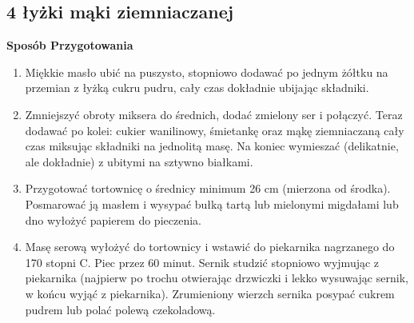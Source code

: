\documentclass[12pt, letterpaper, titlepage]{article}
\begin{document}
\subsection{4 łyżki mąki ziemniaczanej}

\textbf{Sposób Przygotowania }

\begin{enumerate}
\item Miękkie masło ubić na puszysto, stopniowo dodawać po jednym żółtku na przemian z łyżką cukru pudru, cały czas dokładnie ubijając składniki.
\item Zmniejszyć obroty miksera do średnich, dodać zmielony ser i połączyć. Teraz dodawać po kolei: cukier wanilinowy, śmietankę oraz mąkę ziemniaczaną cały czas miksując składniki na jednolitą masę. Na koniec wymieszać (delikatnie, ale dokładnie) z ubitymi na sztywno białkami.
\item Przygotować tortownicę o średnicy minimum 26 cm (mierzona od środka). Posmarować ją masłem i wysypać bułką tartą lub mielonymi migdałami lub dno wyłożyć papierem do pieczenia.
\item Masę serową wyłożyć do tortownicy i wstawić do piekarnika nagrzanego do 170 stopni C. Piec przez 60 minut. Sernik studzić stopniowo wyjmując z piekarnika (najpierw po trochu otwierając drzwiczki i lekko wysuwając sernik, w końcu wyjąć z piekarnika). Zrumieniony wierzch sernika posypać cukrem pudrem lub polać polewą czekoladową.
\end{enumerate}
\end{document}

